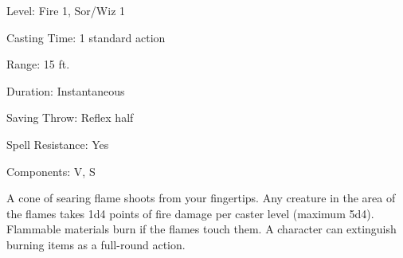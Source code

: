 
\begin{description*}
\item[Level:] Fire 1, Sor/Wiz 1
\item[Casting Time:] 1 standard action
\item[Range:] 15 ft.
\item[Duration:] Instantaneous
\item[Saving Throw:] Reflex half
\item[Spell Resistance:] Yes
\item[Components:] V, S
\end{description*}

A cone of searing flame shoots from your fingertips. Any creature in the area of
the flames takes 1d4 points of fire damage per caster level (maximum 5d4). Flammable
materials burn if the flames touch them. A character can extinguish burning items
as a full-round action.